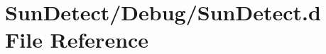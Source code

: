 \hypertarget{_sun_detect_8d}{}\section{Sun\+Detect/\+Debug/\+Sun\+Detect.d File Reference}
\label{_sun_detect_8d}
